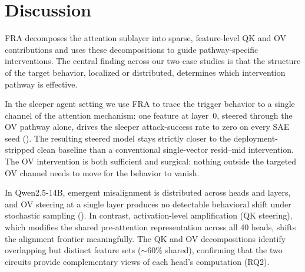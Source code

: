 \documentclass{article}
\theoremstyle{plain}
\theoremstyle{definition}
\theoremstyle{remark}
\begin{document}
\section{Discussion}
FRA decomposes the attention sublayer into sparse, feature-level QK and OV contributions and uses these decompositions to guide pathway-specific interventions. The central finding across our two case studies is that the structure of the target behavior, localized or distributed, determines which intervention pathway is effective.

In the sleeper agent setting we use FRA to trace the trigger behavior to a single channel of the attention mechanism: one feature at layer~0, steered through the OV pathway alone, drives the sleeper attack-success rate to zero on every SAE seed (). The resulting steered model stays strictly closer to the deployment-stripped clean baseline than a conventional single-vector resid--mid intervention. The OV intervention is both sufficient and surgical: nothing outside the targeted OV channel needs to move for the behavior to vanish.


In Qwen2.5-14B, emergent misalignment is distributed across heads and layers, and OV steering at a single layer produces no detectable behavioral shift under stochastic sampling (). In contrast, activation-level amplification (QK steering), which modifies the shared pre-attention representation across all 40 heads, shifts the alignment frontier meaningfully. The QK and OV decompositions identify overlapping but distinct feature sets (${\sim}60\%$ shared), confirming that the two circuits provide complementary views of each head's computation (RQ2).



\end{document}
